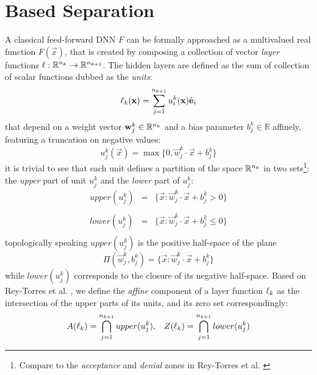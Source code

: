 \section{\ReLU Based Separation}\label{sec:separability}

A classical feed-forward DNN $F$ can be formally approached as a multivalued real function $F(\vec{x})$, that is created by composing a collection of vector \emph{layer} functions $\ell:\mathbb{R}^{n_k}\rightarrow\mathbb{R}^{n_{k+1}}$. The hidden layers are defined as the sum of collection of scalar functions dubbed as the \emph{units}: 
\begin{equation}\label{eq:layer}
\ell_k(\mathbf{x}) = \sum^{n_{k+1}}_{j=1} u_i^k(\mathbf{x}) \hat{\textbf{e}}_i
\end{equation}
that depend on a weight vector $\mathbf{w}_j^k\in\mathbb{R}^{n_k}$ and a bias parameter $b_j^k\in\mathbb{R}$ affinely, featuring a truncation on negative values:
\begin{equation}\label{eq:unit}
u_j^k(\vec{x}) = \max\{0,\vec{w}_j^k \cdot \vec{x} + b_j^k\}
\end{equation}
it is trivial to see that each unit defines a partition of the space $\mathbb{R}^{n_k}$ in two sets\footnote{Compare to the \emph{acceptance} and \emph{denial} zones in Rey-Torres et al. \cite{reyRiera2019ModellingClassificationReLU}}: the \emph{upper} part of unit $u_j^k$ and the \emph{lower} part of $u_j^k$:
\begin{equation}\label{eq:upperAndLowerSets}
\begin{array}{lcl}
    upper(u_j^k) &=& \{\vec{x}:\vec{w}_j^k \cdot \vec{x} + b_j^k > 0\}\\\\
    lower(u_j^k) &=& \{\vec{x}:\vec{w}_j^k \cdot \vec{x} + b_j^k\leq 0\}\\
\end{array}
\end{equation}
topologically speaking $upper(u_j^k)$ is the positive half-space of the plane 
\begin{equation}\label{eq:separatingPlane}
    \Pi(\vec{w}_j^k,b_j^k) = 
    \{ 
     \vec{x}:\vec{w}_j^k\cdot\vec{x}+b_j^k 
    \}
\end{equation}
while $lower(u_j^k)$ corresponds to the closure of its negative half-space. Based on Rey-Torres et al. \cite{reyRiera2019ModellingClassificationReLU}, we define the \emph{affine} component of a layer function $\ell_k$ as the intersection of the upper parts of its units, and its zero set correspondingly:
\begin{equation}\label{eq:affineCompAndZeroSet}
\begin{array}{cc}
    A(\ell_k) = \displaystyle\bigcap_{j=1}^{n_{k+1}}upper(u_j^k), &
    Z(\ell_k) = \displaystyle\bigcap_{j=1}^{n_{k+1}}lower(u_j^k)\\
    \end{array}
\end{equation}
